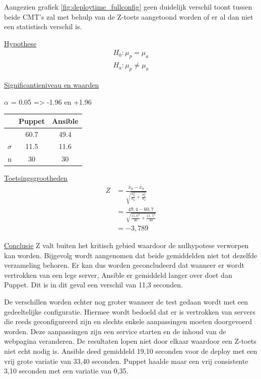 Aangezien grafiek \ref{fig:deploytime_fullconfig} geen duidelijk verschil toont tussen beide \gls{CMT}'s zal met behulp van de Z-toets aangetoond worden of er al dan niet een statistisch verschil is.

\underline{Hypothese}
\begin{align*}
H_0:  \mu_p = \mu_a \\
H_a: \mu_p\neq \mu_a 
\end{align*}


\underline{Significantieniveau en waarden} \newline

 $\alpha$ = 0.05 => -1.96 en +1.96 \newline

		\begin{tabular}{ r |c |c }
			& Puppet & Ansible\\\hline
			\unexpanded{$ \bar x  $} &  60.7 & 49.4\\ \hline
			$\sigma$ & 11.5 & 11.6\\ \hline
			n &  30 &  30

\end{tabular}


\underline{Toetsingsgrootheden}
\begin{equation} \label{eq1}
\begin{split}
Z &= \tfrac{\bar x_p - \bar x_a}{\sqrt{\tfrac{\sigma_p^2}{n_p}+\tfrac{\sigma_a^2}{n_a}}}\\
& = \tfrac{49,4 - 60,7}{\sqrt{\tfrac{11,6^2}{30}+\tfrac{11,5^2}{30}}} \\
& = -3,789
\end{split}
\end{equation}



\underline{Conclusie} \newline
Z valt buiten het kritisch gebied waardoor de nulhypotese verworpen kan worden. Bijgevolg wordt aangenomen dat beide gemiddelden niet tot dezelfde verzameling behoren. Er kan dus worden geconcludeerd dat wanneer er wordt vertrokken van een lege server, Ansible er gemiddeld langer over doet dan Puppet. Dit is in dit geval een verschil van 11,3 seconden. \newline

De verschillen worden echter nog groter wanneer de test gedaan wordt met een gedeeltelijke configuratie. Hiermee wordt bedoeld dat er is vertrokken van servers die reeds geconfigureerd zijn en slechts enkele aanpassingen moeten doorgevoerd worden. Deze aanpassingen zijn een service starten en de inhoud van de webpagina veranderen. De resultaten lopen niet door elkaar waardoor een Z-toets niet echt nodig is. Ansible deed gemiddeld 19,10 seconden voor de deploy met een vrij grote variatie van 33,40 seconden. Puppet haalde maar een vrij consistente 3,10 seconden met een variatie van 0,35. \newline


